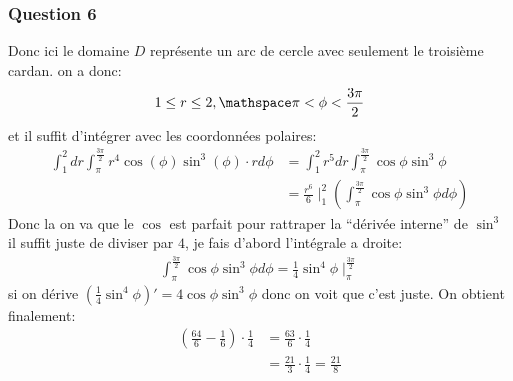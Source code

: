 \documentclass[a4paper]{article}
\begin{document}
\subsubsection{Question 6}
Donc ici le domaine $D$ représente un arc de cercle avec seulement le troisième cardan. on a donc:
\begin{align*} 
    1 \leq r \leq 2, \mathspace \pi < \phi < \frac{3\pi}{2}
\end{align*}
et il suffit d'intégrer avec les coordonnées polaires:
\begin{align*} 
    \int_1^2 dr \int_\pi^{\frac{3\pi}{2}} r^4 \cos\left(\phi\right)\sin^3\left(\phi\right)\cdot r d \phi &= \int_1^2 r^5 dr \int_\pi^{\frac{3\pi}{2}}\cos \phi \sin^3 \phi\\
                                                                                                         &= \frac{r^6}{6}\mid_1^2 \left(\int_\pi^{\frac{3\pi}{2}}\cos \phi \sin^3 \phi d\phi\right)
\end{align*}
Donc la on va que le $\cos$ est parfait pour rattraper la ``dérivée interne'' de $\sin^3$ il suffit juste de diviser par $4$, je fais d'abord l'intégrale a droite:
\begin{align*} 
    \int_\pi^{\frac{3\pi}{2}} \cos \phi \sin^3 \phi d\phi = \frac{1}{4}\sin^4 \phi \mid_\pi^{\frac{3\pi}{2}}
\end{align*}
si on dérive $\left(\frac{1}{4}\sin^4 \phi\right)' = 4\cos \phi \sin^3 \phi$ donc on voit que c'est juste. On obtient finalement:
\begin{align*} 
\left(\frac{64}{6} - \frac{1}{6} \right)\cdot \frac{1}{4} &= \frac{63}{6} \cdot  \frac{1}{4}\\
 &= \frac{21}{3}  \cdot  \frac{1}{4} = \frac{21}{8}
\end{align*}
\end{document}
